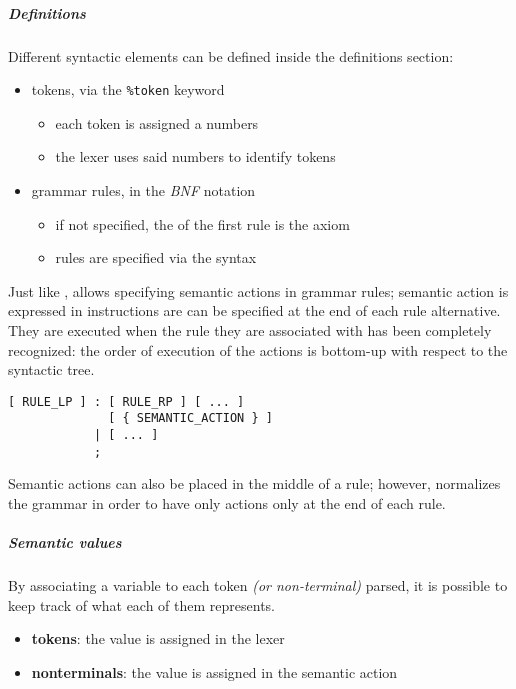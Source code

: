 \documentclass[english]{article}
\begin{document}
\subparagraph*{Definitions}
Different syntactic elements can be defined inside the definitions section:
\begin{itemize}
  \item tokens, via the \texttt{\%token} keyword
        \begin{itemize}
          \item each token is assigned a numbers
          \item the lexer uses said numbers to identify tokens
        \end{itemize}
  \item grammar rules, in the \textit{BNF} notation
        \begin{itemize}
          \item if not specified, the \LP of the first rule is the axiom
          \item rules are specified via the syntax
        \end{itemize}
\end{itemize}

Just like \flex, \bison allows specifying semantic actions in grammar rules;
semantic action is expressed in \clang instructions are can be specified at the end of each rule alternative.
They are executed when the rule they are associated with has been completely recognized:
the order of execution of the actions is bottom-up with respect to the syntactic tree.

\begin{lstlisting}[morekeywords={RULE_LP, RULE_RP, SEMANTIC_ACTION}, caption={Definition section of a \bison file}, label={lst:bison-definition-section}]
[ RULE_LP ] : [ RULE_RP ] [ ... ]
              [ { SEMANTIC_ACTION } ]
            | [ ... ]
            ;
\end{lstlisting}

Semantic actions can also be placed in the middle of a rule;
however, \bison normalizes the grammar in order to have only actions only at the end of each rule.

\subparagraph*{Semantic values}

By associating a variable to each token \textit{(or non-terminal)} parsed, it is possible to keep track of what each of them represents.

\begin{itemize}
  \item \textbf{tokens}: the value is assigned in the lexer
  \item \textbf{nonterminals}: the value is assigned in the semantic action
\end{itemize}
\end{document}
